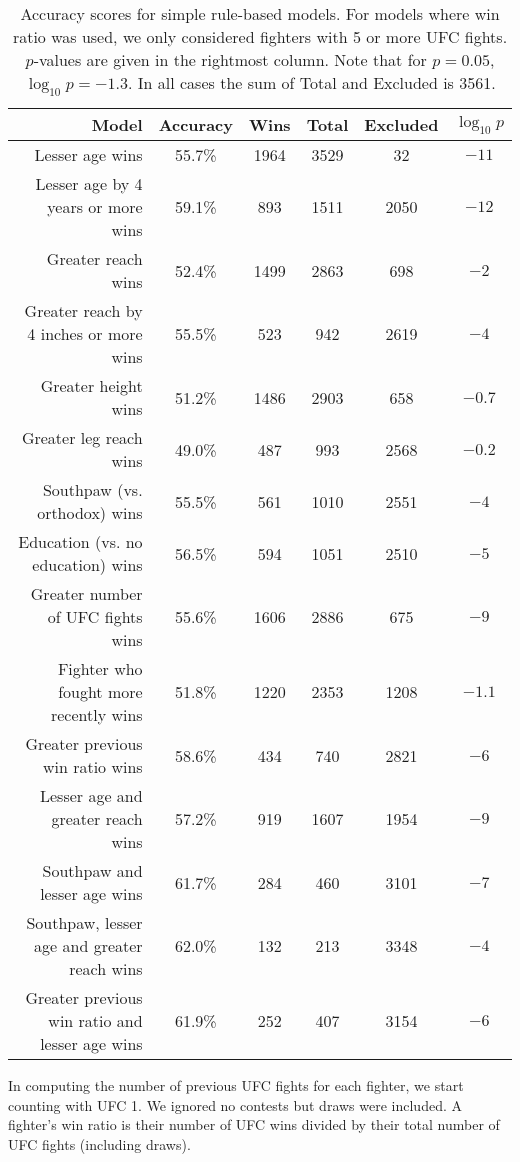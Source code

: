 \begin{center}
\begin{table}[h]
\begin{tabular}{r|ccccc}
  \toprule
  Model & Accuracy & Wins & Total & Excluded & $\log_{10}p$\\
  \hline
  Lesser age wins & 55.7\% & 1964 & 3529 & 32 & $-11$\\
  Lesser age by 4 years or more wins & 59.1\% & 893 & 1511 & 2050 & $-12$\\
  Greater reach wins & 52.4\% & 1499 & 2863 & 698 & $-2$\\
  Greater reach by 4 inches or more wins & 55.5\% & 523 & 942 & 2619 & $-4$\\
  Greater height wins & 51.2\% & 1486 & 2903 & 658 & $-0.7$\\
  Greater leg reach wins & 49.0\% & 487 & 993 & 2568 & $-0.2$\\
  Southpaw (vs. orthodox) wins & 55.5\% & 561 & 1010 & 2551 & $-4$\\
  Education (vs. no education) wins & 56.5\% & 594 & 1051 & 2510 & $-5$\\
  Greater number of UFC fights wins & 55.6\% & 1606 & 2886 & 675 & $-9$\\
  Fighter who fought more recently wins & 51.8\% & 1220 & 2353 & 1208 & $-1.1$\\
  Greater previous win ratio wins & 58.6\% & 434 & 740 & 2821 & $-6$\\
  \hline
  Lesser age and greater reach wins & 57.2\% & 919 & 1607 & 1954 & $-9$\\
  Southpaw and lesser age wins & 61.7\% & 284 & 460 & 3101 & $-7$\\
  Southpaw, lesser age and greater reach wins & 62.0\% & 132 & 213 & 3348 & $-4$\\
  Greater previous win ratio and lesser age wins & 61.9\% & 252 & 407 & 3154 & $-6$\\
  \bottomrule
\end{tabular}
\caption{Accuracy scores for simple rule-based models. For models where win ratio was used, we only considered
fighters with 5 or more UFC fights. $p$-values are given in the rightmost column. Note that for $p=0.05$, $\log_{10}p = -1.3$. In all
cases the sum of 
Total and Excluded is 3561.}
\label{table_simple_rules}
\end{table}
\end{center}

In computing the number of previous UFC fights for each fighter, we start
counting with UFC 1. We ignored no contests but draws were included. A fighter's
win ratio is their number of UFC wins divided by their
total number of UFC fights (including draws).

